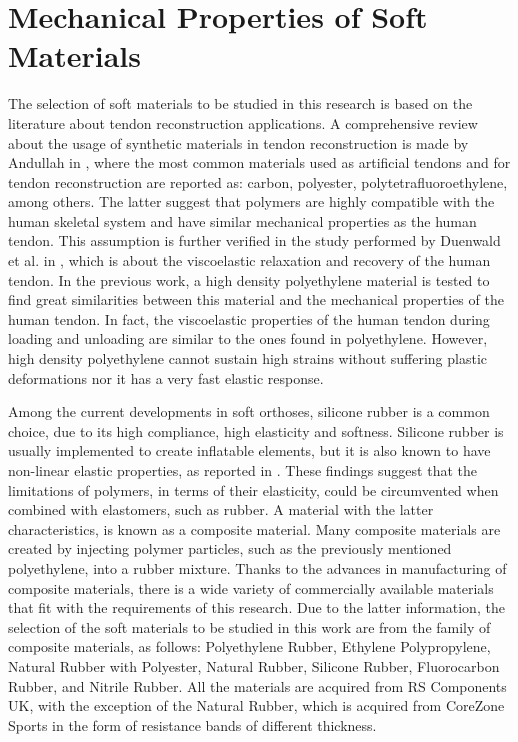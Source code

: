 \section{Mechanical Properties of Soft Materials} \label{sec:mechprop}

The selection of soft materials to be studied in this research is based on the literature about tendon reconstruction applications. A comprehensive review about the usage of synthetic materials in tendon reconstruction is made by Andullah in \cite{abdullah2015usage}, where the most common materials used as artificial tendons and for tendon reconstruction are reported as: carbon, polyester, polytetrafluoroethylene, among others. The latter suggest that polymers are highly compatible with the human skeletal system and have similar mechanical properties as the human tendon. This assumption is further verified in the study performed by Duenwald et al. in \cite{duenwald2009viscoelastic}, which is about the viscoelastic relaxation and recovery of the human tendon. In the previous work, a high density polyethylene material is tested to find great similarities between this material and the mechanical properties of the human tendon. In fact, the viscoelastic properties of the human tendon during loading and unloading are similar to the ones found in polyethylene. However, high density polyethylene cannot sustain high strains without suffering plastic deformations nor it has a very fast elastic response.

Among the current developments in soft orthoses, silicone rubber is a common choice, due to its high compliance, high elasticity and softness. Silicone rubber is usually implemented to create inflatable elements, but it is also known to have non-linear elastic properties, as reported in \cite{roylance2008mechanical}. These findings suggest that the limitations of polymers, in terms of their elasticity, could be circumvented when combined with elastomers, such as rubber. A material with the latter characteristics, is known as a composite material. Many composite materials are created by injecting polymer particles, such as the previously mentioned polyethylene, into a rubber mixture. Thanks to the advances in manufacturing of composite materials, there is a wide variety of commercially available materials that fit with the requirements of this research. Due to the latter information, the selection of the soft materials to be studied in this work are from the family of composite materials, as follows: Polyethylene Rubber, Ethylene Polypropylene, Natural Rubber with Polyester, Natural Rubber, Silicone Rubber, Fluorocarbon Rubber, and Nitrile Rubber. All the materials are acquired from RS Components UK\textregistered{}, with the exception of the Natural Rubber, which is acquired from CoreZone Sports\textregistered{} in the form of resistance bands of different thickness.

